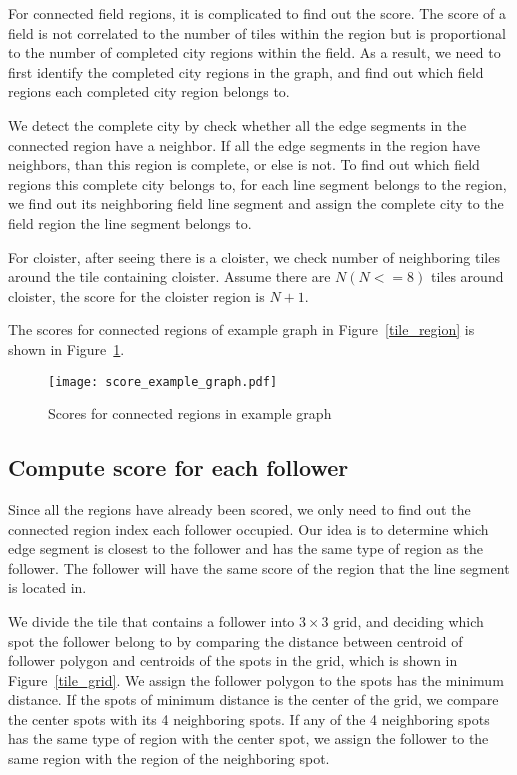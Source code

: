 For connected field regions, it is complicated to find out the score. The score of a field is not correlated to the number of tiles within the region but is proportional to the number of completed city regions within the field. As a result, we need to first identify the completed 
city regions in the graph, and find out which field regions each completed city region belongs to.

We detect the complete city by check whether all the edge segments in the connected region have a neighbor. If all the edge segments in the 
region have neighbors, than this region is complete, or else is not. To find out which field regions this complete city belongs to, for each 
line segment belongs to the region, we find out its neighboring field line segment and assign the complete city to the field region the line segment belongs to.

For cloister, after seeing there is a cloister, we check number of neighboring tiles around the tile containing cloister. Assume there are $N(N<=8)$ tiles around cloister, the score for the cloister region is $N+1$.

The scores for connected regions of example graph in Figure~\ref{tile_region} is shown in Figure~\ref{score_eg_graph}.

\begin{figure}[htbp]
	  \centering
	  \texttt{[image: score\_example\_graph.pdf]}
	  \caption{Scores for connected regions in example graph}
	  \label{score_eg_graph}
\end{figure}

\subsection{Compute score for each follower}
Since all the regions have already been scored, we only need to find out the connected region index each follower occupied. Our idea is to 
determine which edge segment is closest to the follower and has the same type of region as the follower. The follower will have the same score of the region that the line segment is located in.

We divide the tile that contains a follower into $3\times3$ grid, and deciding which spot the follower belong to by comparing the distance between centroid of follower polygon and centroids 
of the spots in the grid, which is shown in Figure~\ref{tile_grid}. We assign the follower polygon to the spots has the minimum distance. If the spots of minimum distance is the center of the grid, we compare the center spots with its 4 neighboring spots. If any of the 4 neighboring spots has the same type of region with the center spot, we assign the follower to the same region with the region of the neighboring spot. 

